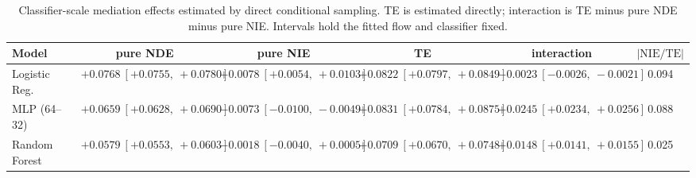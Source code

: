 \begin{table}[htbp]
  \centering
  \caption{Classifier-scale mediation effects estimated by direct conditional sampling. TE is estimated directly; interaction is TE minus pure NDE minus pure NIE. Intervals hold the fitted flow and classifier fixed.}
  \label{tab:acs_gap_overall}
  \begin{tabular}{lccccc}
    \toprule
    Model & pure NDE & pure NIE & TE & interaction & $|\mathrm{NIE}/\mathrm{TE}|$ \\
    \midrule
    Logistic Reg. & $+0.0768\ [+0.0755,\ +0.0780]$ & $+0.0078\ [+0.0054,\ +0.0103]$ & $+0.0822\ [+0.0797,\ +0.0849]$ & $-0.0023\ [-0.0026,\ -0.0021]$ & 0.094 \\
    MLP (64--32) & $+0.0659\ [+0.0628,\ +0.0690]$ & $-0.0073\ [-0.0100,\ -0.0049]$ & $+0.0831\ [+0.0784,\ +0.0875]$ & $+0.0245\ [+0.0234,\ +0.0256]$ & 0.088 \\
    Random Forest & $+0.0579\ [+0.0553,\ +0.0603]$ & $-0.0018\ [-0.0040,\ +0.0005]$ & $+0.0709\ [+0.0670,\ +0.0748]$ & $+0.0148\ [+0.0141,\ +0.0155]$ & 0.025 \\
    \bottomrule
  \end{tabular}
\end{table}